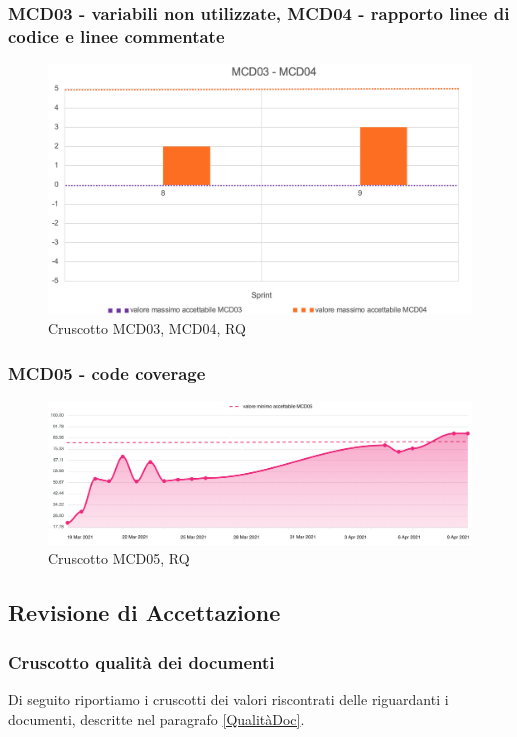 \subsubsection*{MCD03 - variabili non utilizzate, MCD04 - rapporto linee di codice e linee commentate}
\begin{figure}[H] 
    \centering
    \includegraphics[scale = 0.6]{immagini/MCD03-04.png}
    \caption{Cruscotto MCD03, MCD04, RQ}
\end{figure}

\subsubsection*{MCD05 - code coverage}
\begin{figure}[H] 
    \centering
    \includegraphics[scale = 0.4]{immagini/MCD05.png}
    \caption{Cruscotto MCD05, RQ}
\end{figure}

\subsection{Revisione di Accettazione}
\subsubsection{Cruscotto qualità dei documenti}
Di seguito riportiamo i cruscotti dei valori riscontrati delle  riguardanti i documenti, descritte nel paragrafo \ref{QualitàDoc}.

